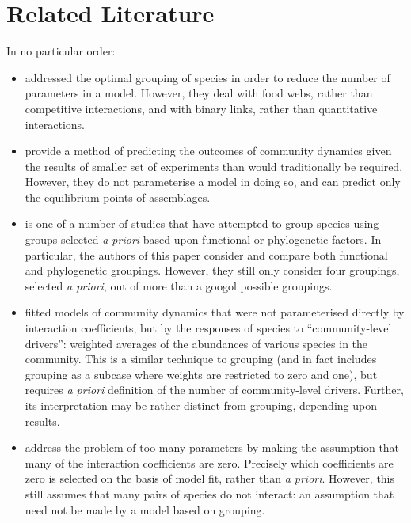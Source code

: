 \documentclass[a4paper,11pt]{article}
\begin{document}
\section{Related Literature}

In no particular order:
\begin{itemize}
	\item
		\Textcite{allesina2009food} addressed the optimal grouping of species in order to reduce the number of parameters in a model.
		However, they deal with food webs, rather than competitive interactions, and with binary links, rather than quantitative interactions.
	\item
		\Textcite{maynard2020predicting} provide a method of predicting the outcomes of community dynamics given the results of smaller set of experiments than would traditionally be required.
		However, they do not parameterise a model in doing so, and can predict only the equilibrium points of assemblages.
	\item
		\Textcite{uriarte2004spatially} is one of a number of studies that have attempted to group species using groups selected \emph{a priori} based upon functional or phylogenetic factors.
		In particular, the authors of this paper consider and compare both functional and phylogenetic groupings.
		However, they still only consider four groupings, selected \emph{a priori}, out of more than a googol possible groupings.
	\item
		\Textcite{ovaskainen2017species} fitted models of community dynamics that were not parameterised directly by interaction coefficients, but by the responses of species to ``community-level drivers'': weighted averages of the abundances of various species in the community.
		This is a similar technique to grouping (and in fact includes grouping as a subcase where weights are restricted to zero and one), but requires \emph{a priori} definition of the number of community-level drivers.
		Further, its interpretation may be rather distinct from grouping, depending upon results.
	\item
		\Textcite{weiss2021disentangling} address the problem of too many parameters by making the assumption that many of the interaction coefficients are zero.
		Precisely which coefficients are zero is selected on the basis of model fit, rather than \emph{a priori}.
		However, this still assumes that many pairs of species do not interact: an assumption that need not be made by a model based on grouping.
\end{itemize}
\end{document}
